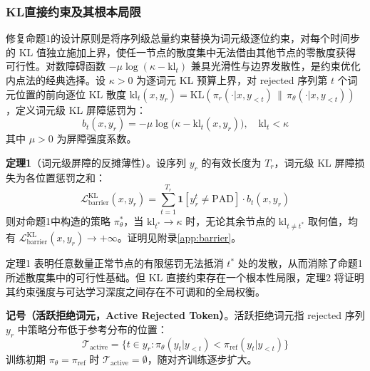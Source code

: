 \documentclass[lettersize,journal]{IEEEtran}
\begin{document}
\subsubsection{KL直接约束及其根本局限}\label{sec:kl-barrier}
修复命题1的设计原则是将序列级总量约束替换为词元级逐位约束，对每个时间步的 KL 值独立施加上界，使任一节点的散度集中无法借由其他节点的零散度获得可行性。对数障碍函数 $-\mu\log(\kappa - \mathrm{kl}_t)$ 兼具光滑性与边界发散性，是约束优化内点法的经典选择\cite{boyd2004convex}。设 $\kappa > 0$ 为逐词元 KL 预算上界，对 rejected 序列第 $t$ 个词元位置的前向逐位 KL 散度 $\mathrm{kl}_t(x, y_r) = \mathrm{KL}(\pi_r(\cdot|x, y_{<t}) \,\|\, \pi_\theta(\cdot|x, y_{<t}))$，定义词元级 KL 屏障惩罚为：
\begin{equation}
    b_t(x, y_r) = -\mu \log\bigl(\kappa - \mathrm{kl}_t(x, y_r)\bigr),
    \quad \mathrm{kl}_t < \kappa
\end{equation}
其中 $\mu > 0$ 为屏障强度系数。

\textbf{定理1}（词元级屏障的反摊薄性）。设序列 $y_r$ 的有效长度为 $T_r$，词元级 KL 屏障损失为各位置惩罚之和：
\begin{equation}
    \mathcal{L}^{\text{KL}}_{\text{barrier}}(x, y_r) =
    \sum_{t=1}^{T_r} \mathbf{1}[y_r^t \neq \text{PAD}] \cdot b_t(x, y_r)
\end{equation}
则对命题1中构造的策略 $\pi_\theta^*$，当 $\mathrm{kl}_{t^*} \to \kappa$ 时，无论其余节点的 $\mathrm{kl}_{t \neq t^*}$ 取何值，均有 $\mathcal{L}^{\text{KL}}_{\text{barrier}}(x, y_r) \to +\infty$。证明见附录\ref{app:barrier}。

定理1 表明任意数量正常节点的有限惩罚无法抵消 $t^*$ 处的发散，从而消除了命题1所述散度集中的可行性基础。但 KL 直接约束存在一个根本性局限，定理2 将证明其约束强度与可达学习深度之间存在不可调和的全局权衡。

\textbf{记号（活跃拒绝词元，Active Rejected Token）}。活跃拒绝词元指 rejected 序列 $y_r$ 中策略分布低于参考分布的位置：
\begin{equation}\label{eq:active-def}
\mathcal{T}_{\text{active}} = \{t \in y_r : \pi_\theta(y_t|y_{<t}) < \pi_{\text{ref}}(y_t|y_{<t})\}
\end{equation}
训练初期 $\pi_\theta = \pi_{\text{ref}}$ 时 $\mathcal{T}_{\text{active}} = \emptyset$，随对齐训练逐步扩大。
\end{document}
